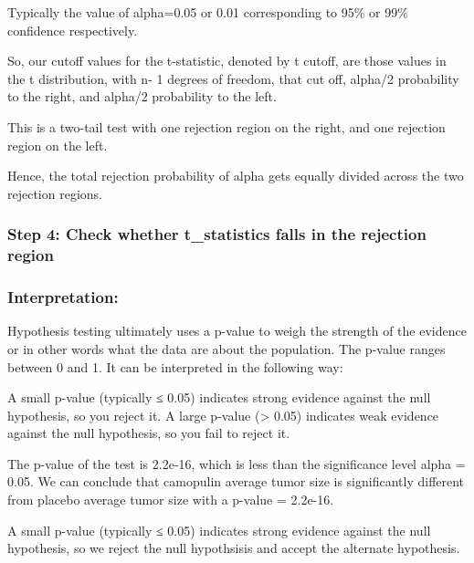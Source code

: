 \documentclass[
]{article}
\begin{document}
Typically the value of alpha=0.05 or 0.01 corresponding to 95\% or 99\%
confidence respectively.

So, our cutoff values for the t-statistic, denoted by t cutoff, are
those values in the t distribution, with n- 1 degrees of freedom, that
cut off, alpha/2 probability to the right, and alpha/2 probability to
the left.

This is a two-tail test with one rejection region on the right, and one
rejection region on the left.

Hence, the total rejection probability of alpha gets equally divided
across the two rejection regions.

\hypertarget{step-4-check-whether-t_statistics-falls-in-the-rejection-region}{%
\subsubsection{Step 4: Check whether t\_statistics falls in the
rejection
region}\label{step-4-check-whether-t_statistics-falls-in-the-rejection-region}}

\hypertarget{interpretation}{%
\subsubsection{Interpretation:}\label{interpretation}}

Hypothesis testing ultimately uses a p-value to weigh the strength of
the evidence or in other words what the data are about the population.
The p-value ranges between 0 and 1. It can be interpreted in the
following way:

A small p-value (typically ≤ 0.05) indicates strong evidence against the
null hypothesis, so you reject it. A large p-value (\textgreater{} 0.05)
indicates weak evidence against the null hypothesis, so you fail to
reject it.

The p-value of the test is 2.2e-16, which is less than the significance
level alpha = 0.05. We can conclude that camopulin average tumor size is
significantly different from placebo average tumor size with a p-value =
2.2e-16.

A small p-value (typically ≤ 0.05) indicates strong evidence against the
null hypothesis, so we reject the null hypothsisis and accept the
alternate hypothesis.
\end{document}
